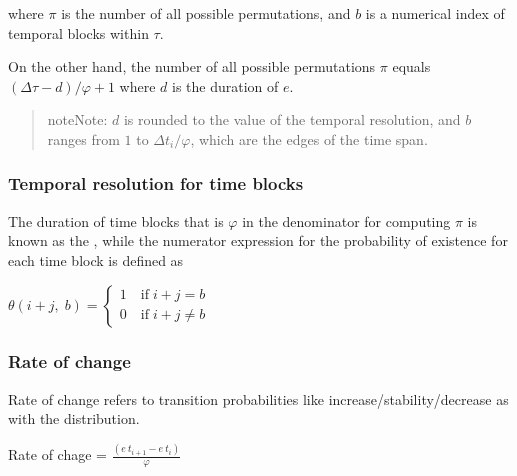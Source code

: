 \documentclass[a4paper,12pt,english]{sphinxhowto}
\begin{document}
where \(\pi\) is the number of all possible permutations,
and \(b\) is a numerical index of temporal blocks within \(\tau\).

On the other hand, the number of all possible permutations \(\pi\) equals \({(\Delta \tau - d)}/{\varphi + 1}\)
where \(d\) is the duration of \(e\).
\begin{quote}

\begin{sphinxadmonition}{note}{Note:}
\(d\) is rounded to the value of the temporal resolution, and \(b\) ranges
from \(1\) to \(\Delta t_i/\varphi\), which are the edges of the time span.
\end{sphinxadmonition}
\end{quote}



\subsubsection{Temporal resolution for time blocks}
\label{\detokenize{Uncertainty:temporal-resolution-for-time-blocks}}
The duration of time blocks that is \(\varphi\) in the denominator for computing
\(\pi\) is known as the , while the numerator expression for
the probability of existence for each time block is defined as

\(\theta (i+j,\;b) = \begin{cases}1 \quad \text{if}\; i+j = b  \\ 0 \quad \text{if}\; i+j \neq b \end{cases}\)



\subsubsection{Rate of change}
\label{\detokenize{Uncertainty:rate-of-change}}
Rate of change refers to transition probabilities like increase/stability/decrease as with the {\hyperref[\detokenize{Uncertainty:trap}]{}} distribution.

Rate of chage =  \(\frac{(e~t_{i+1} - e~t_i)}{\varphi}\)
\end{document}
